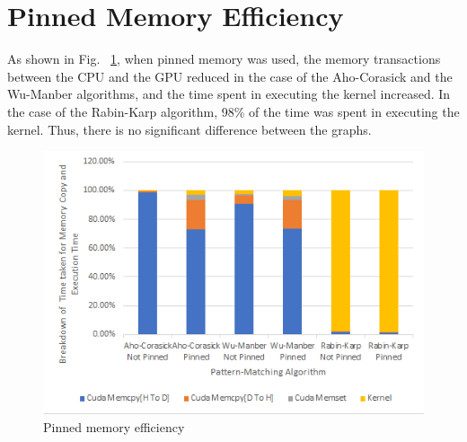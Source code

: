\section{Pinned Memory Efficiency}
As shown in Fig. ~\ref{fig:pinnedmemoryeffic}, when pinned memory was used, the memory transactions between the CPU and the GPU reduced in the case of the Aho-Corasick and the Wu-Manber algorithms, and the time spent in executing the kernel increased. In the case of the Rabin-Karp algorithm, 98\% of the time was spent in executing the kernel. Thus, there is no significant difference between the graphs.

\begin{figure}[H]
	\centering
	\includegraphics[width=12cm]{pinnedmemoryeffic.png}
	\caption{Pinned memory efficiency}
	\label{fig:pinnedmemoryeffic}
\end{figure}
\squeezeup
